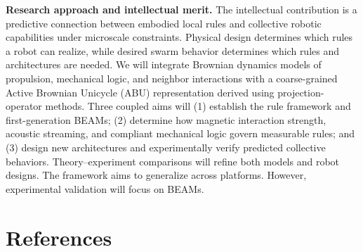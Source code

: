 \documentclass[11pt]{article}
\begin{document}
\textbf{Research approach and intellectual merit.}
The intellectual contribution is a predictive connection between embodied local rules and collective robotic capabilities under microscale constraints.
Physical design determines which rules a robot can realize, while desired swarm behavior determines which rules and architectures are needed.
We will integrate Brownian dynamics models of propulsion, mechanical logic, and neighbor interactions with a coarse-grained Active Brownian Unicycle (ABU) representation derived using projection-operator methods.
Three coupled aims will (1) establish the rule framework and first-generation BEAMs; (2) determine how magnetic interaction strength, acoustic streaming, and compliant mechanical logic govern measurable rules; and (3) design new architectures and experimentally verify predicted collective behaviors.
Theory--experiment comparisons will refine both models and robot designs.
The framework aims to generalize across platforms.  However, experimental validation will focus on BEAMs.


\section*{References}
\printbibliography[heading=none]
\end{document}

